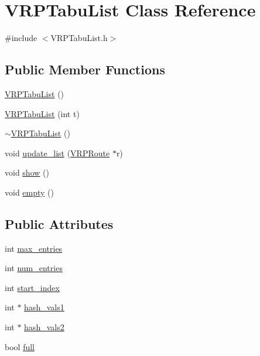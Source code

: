 \hypertarget{class_v_r_p_tabu_list}{
\section{VRPTabuList Class Reference}
\label{class_v_r_p_tabu_list}
}


{\ttfamily \#include $<$VRPTabuList.h$>$}

\subsection*{Public Member Functions}
\begin{DoxyCompactItemize}
\item 
\hyperlink{class_v_r_p_tabu_list_a65e5b79cb68f953aeb388b5fb49a92ea}{VRPTabuList} ()
\item 
\hyperlink{class_v_r_p_tabu_list_aedd06d0ad1530d923920aa9a0a1429b4}{VRPTabuList} (int t)
\item 
\hyperlink{class_v_r_p_tabu_list_a04382257eb05860430d826987fd571be}{$\sim$VRPTabuList} ()
\item 
void \hyperlink{class_v_r_p_tabu_list_aedc1f335f43a324bcd04167407cbfb8e}{update\_\-list} (\hyperlink{class_v_r_p_route}{VRPRoute} $\ast$r)
\item 
void \hyperlink{class_v_r_p_tabu_list_a8379e2849413468965d9df8301dd398f}{show} ()
\item 
void \hyperlink{class_v_r_p_tabu_list_a3b445856bb38f763eb8f23159b488f04}{empty} ()
\end{DoxyCompactItemize}
\subsection*{Public Attributes}
\begin{DoxyCompactItemize}
\item 
int \hyperlink{class_v_r_p_tabu_list_aa799c64c2debc36aa4b9f75556683041}{max\_\-entries}
\item 
int \hyperlink{class_v_r_p_tabu_list_aeb64bb8470793cd64c5ea9036fb1763b}{num\_\-entries}
\item 
int \hyperlink{class_v_r_p_tabu_list_ad6970eb53ab71e79bb6ec7230d505d5d}{start\_\-index}
\item 
int $\ast$ \hyperlink{class_v_r_p_tabu_list_a75db2b708942566d2150a969642c688a}{hash\_\-vals1}
\item 
int $\ast$ \hyperlink{class_v_r_p_tabu_list_a060190495a6a0e1487f28407cee844b4}{hash\_\-vals2}
\item 
bool \hyperlink{class_v_r_p_tabu_list_af6fe31640c8f09894386aa0b175adac2}{full}
\end{DoxyCompactItemize}


